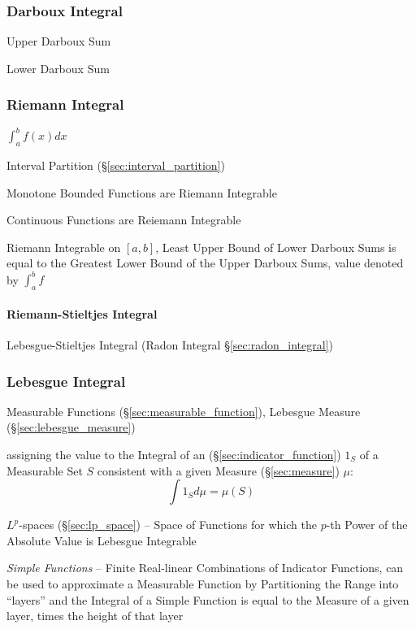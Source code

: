 \subsubsection{Darboux Integral}\label{sec:darboux_integral}

Upper Darboux Sum

Lower Darboux Sum



\subsubsection{Riemann Integral}\label{sec:riemann_integral}

$\int_a^b f(x) dx$

Interval Partition (\S\ref{sec:interval_partition})

Monotone Bounded Functions are Riemann Integrable

Continuous Functions are Reiemann Integrable

Riemann Integrable on $[a,b]$, Least Upper Bound of Lower Darboux Sums
is equal to the Greatest Lower Bound of the Upper Darboux Sums, value
denoted by $\int_a^b f$



\paragraph{Riemann-Stieltjes Integral}\label{sec:riemann_stieltjes}\hfill

\fist Lebesgue-Stieltjes Integral (Radon Integral \S\ref{sec:radon_integral})



\subsubsection{Lebesgue Integral}\label{sec:lebesgue_integral}

Measurable Functions (\S\ref{sec:measurable_function}),
Lebesgue Measure (\S\ref{sec:lebesgue_measure})

assigning the value to the Integral of an (\S\ref{sec:indicator_function}) $1_S$
of a Measurable Set $S$ consistent with a given Measure (\S\ref{sec:measure})
$\mu$:
\[
  \int 1_S d\mu = \mu(S)
\]

\fist $L^p$-spaces (\S\ref{sec:lp_space}) -- Space of Functions for which the
$p$-th Power of the Absolute Value is Lebesgue Integrable

\emph{Simple Functions} -- Finite Real-linear Combinations of Indicator
Functions, can be used to approximate a Measurable Function by Partitioning the
Range into ``layers'' and the Integral of a Simple Function is equal to the
Measure of a given layer, times the height of that layer


